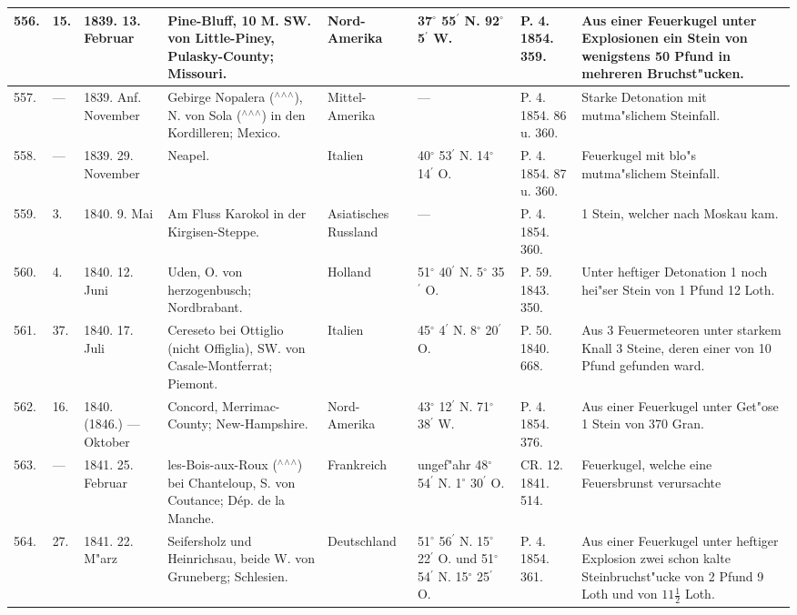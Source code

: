\documentclass[a4paper, 8pt, oneside, polutonikogreek, german]{article}
\begin{document}
\begin{center}
\begin{longtable}{| p{5mm} | p{3mm} | p{15mm} | p{25mm} | p{20mm} | p{14mm} | p{17mm} | p{24mm} |}
        556. & 15. & 1839. 13. Februar & Pine-Bluff, 10 M. SW. von Little-Piney, Pulasky-County; Missouri. & Nord-Amerika & 37$^\circ$ 55$^\prime$ N. 92$^\circ$ 5$^\prime$ W. & P. 4. 1854. 359. & Aus einer Feuerkugel unter Explosionen ein Stein von wenigstens 50 Pfund in mehreren Bruchst"ucken. \\ \hline
        557. & --- & 1839. Anf. November & Gebirge Nopalera ($^\wedge$$^\wedge$$^\wedge$), N. von Sola ($^\wedge$$^\wedge$$^\wedge$) in den Kordilleren; Mexico. & Mittel-Amerika & --- & P. 4. 1854. 86 u. 360. & Starke Detonation mit mutma"slichem Steinfall. \\ \hline
        558. & --- & 1839. 29. November & Neapel. & Italien & 40$^\circ$ 53$^\prime$ N. 14$^\circ$ 14$^\prime$ O. & P. 4. 1854. 87 u. 360. & Feuerkugel mit blo"s mutma"slichem Steinfall. \\ \hline
        559. & 3. & 1840. 9. Mai & Am Fluss Karokol in der Kirgisen-Steppe. & Asiatisches Russland & --- & P. 4. 1854. 360. & 1 Stein, welcher nach Moskau kam. \\ \hline
        560. & 4. & 1840. 12. Juni & Uden, O. von herzogenbusch; Nordbrabant. & Holland & 51$^\circ$ 40$^\prime$ N. 5$^\circ$ 35$^\prime$ O. & P. 59. 1843. 350. & Unter heftiger Detonation 1 noch hei"ser Stein von 1 Pfund 12 Loth. \\ \hline
        561. & 37. & 1840. 17. Juli & Cereseto bei Ottiglio (nicht Offiglia), SW. von Casale-Montferrat; Piemont. & Italien & 45$^\circ$ 4$^\prime$ N. 8$^\circ$ 20$^\prime$ O. & P. 50. 1840. 668. & Aus 3 Feuermeteoren unter starkem Knall 3 Steine, deren einer von 10 Pfund gefunden ward. \\ \hline
        562. & 16. & 1840. (1846.) --- Oktober & Concord, Merrimac-County; New-Hampshire. & Nord-Amerika & 43$^\circ$ 12$^\prime$ N. 71$^\circ$ 38$^\prime$ W. & P. 4. 1854. 376. & Aus einer Feuerkugel unter Get"ose 1 Stein von 370 Gran. \\ \hline
        563. & --- & 1841. 25. Februar & les-Bois-aux-Roux ($^\wedge$$^\wedge$$^\wedge$) bei Chanteloup, S. von Coutance; Dép. de la Manche. & Frankreich & ungef"ahr 48$^\circ$ 54$^\prime$ N. 1$^\circ$ 30$^\prime$ O. & CR. 12. 1841. 514. & Feuerkugel, welche eine Feuersbrunst verursachte \\ \hline
        564. & 27. & 1841. 22. M"arz & Seifersholz und Heinrichsau, beide W. von Gruneberg; Schlesien. & Deutschland & 51$^\circ$ 56$^\prime$ N. 15$^\circ$ 22$^\prime$ O. und 51$^\circ$ 54$^\prime$ N. 15$^\circ$ 25$^\prime$ O. & P. 4. 1854. 361. & Aus einer Feuerkugel unter heftiger Explosion zwei schon kalte Steinbruchst"ucke von 2 Pfund 9 Loth und von $11\frac{1}{2}$ Loth. \\ \hline

\end{longtable}
\end{center}
\end{document}
